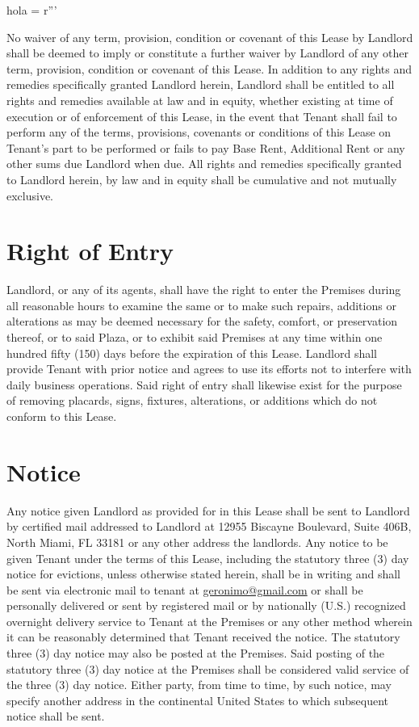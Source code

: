 hola = r'''\documentclass{article}
\makeatletter
\newcommand{\corpaddress}{12955 Biscayne Boulevard, Suite 406B, North Miami, FL 33181}
\newcommand{\noticeemail}{geronimo@gmail.com}
\makeatother
\begin{document}
    No waiver of any term, provision, condition or covenant of this Lease by Landlord shall be deemed to imply or constitute a further waiver by Landlord of any other term, provision, condition or covenant of this Lease. In addition to any rights and remedies specifically granted Landlord herein, Landlord shall be entitled to all rights and remedies available at law and in equity, whether existing at time of execution or of enforcement of this Lease, in the event that Tenant shall fail to perform any of the terms, provisions, covenants or conditions of this Lease on Tenant's part to be performed or fails to pay Base Rent, Additional Rent or any other sums due Landlord when due. All rights and remedies specifically granted to Landlord herein, by law and in equity shall be cumulative and not mutually exclusive.



\section{Right of Entry}
    Landlord, or any of its agents, shall have the right to enter the Premises during all reasonable hours to examine the same or to make such repairs, additions or alterations as may be deemed necessary for the safety, comfort, or preservation thereof, or to said Plaza, or to exhibit said Premises at any time within one hundred fifty (150) days before the expiration of this Lease. Landlord shall provide Tenant with prior notice and agrees to use its efforts not to interfere with daily business operations. Said right of entry shall likewise exist for the purpose of removing placards, signs, fixtures, alterations, or additions which do not conform to this Lease.


\section{Notice}
    Any notice given Landlord as provided for in this Lease shall be sent to Landlord by certified mail addressed to Landlord at \corpaddress{} or any other address the landlords. Any notice to be given Tenant under the terms of this Lease, including the statutory three (3) day notice for evictions, unless otherwise stated herein, shall be in writing and shall be sent via electronic mail to tenant at \href{mailto:\noticeemail}{\noticeemail{}} or shall be personally delivered or sent by registered mail or by nationally (U.S.) recognized overnight delivery service to Tenant at the Premises or any other method wherein it can be reasonably determined that Tenant received the notice. The statutory three (3) day notice may also be posted at the Premises.  Said posting of the statutory three (3) day notice at the Premises shall be considered valid service of the three (3) day notice.  Either party, from time to time, by such notice, may specify another address in the continental United States to which subsequent notice shall be sent.
\end{document}
